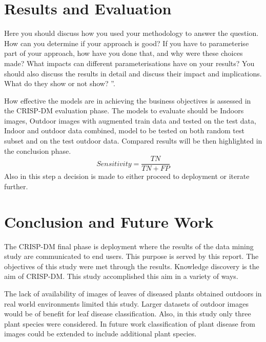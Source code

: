 \documentclass[conference]{IEEEtran}
\begin{document}
\section{Results and Evaluation}
Here you should discuss how you used your methodology to answer the question.  How can you determine if your approach is good?  If you have to parameterise part of your approach, how have you done that, and why were these choices made?  What impacts can different parameterisations have  on  your  results?   You  should  also  discuss  the  results  in  detail  and discuss their impact and implications.  What do they show or not show? ”. \

How effective the models are in achieving the business objectives is assessed in the CRISP-DM evaluation phase. The models to evaluate should be Indoors images, Outdoor images with augmented train data and tested on the test data, Indoor and outdoor data combined, model to be tested on both random test subset and on the test outdoor data. Compared results will be then highlighted in the conclusion phase. \
\begin{equation}
Sensitivity = \frac{TN}{TN + FP}
\end{equation}
Also in this step a decision is made to either proceed to deployment or iterate further.  

\section{Conclusion and Future Work}
The CRISP-DM final phase is deployment where the results of the data mining study are communicated to end users. This purpose is served by this report. The objectives of this study were met through the results. Knowledge discovery is the aim of CRISP-DM. This study accomplished this aim in a variety of ways. 

The lack of availability of images of leaves of diseased plants obtained outdoors in real world environments limited this study. Larger datasets of outdoor images would be of benefit for leaf disease classification. Also, in this study only three plant species were considered. In future work classification of plant disease from images could be extended to include additional plant species.
\end{document}
